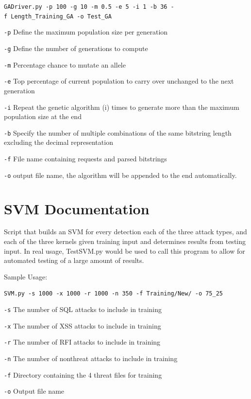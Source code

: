 \begin{appendices}
\texttt{GADriver.py\ -p\ 100\ -g\ 10\ -m\ 0.5\ -e\ 5\ -i\ 1\ -b\ 36\ -f\ Length\_Training\_GA\ -o\ Test\_GA}

\texttt{-p} Define the maximum population size per generation

\texttt{-g} Define the number of generations to compute

\texttt{-m} Percentage chance to mutate an allele

\texttt{-e} Top percentage of current population to carry over unchanged
to the next generation

\texttt{-i} Repeat the genetic algorithm (i) times to generate more than
the maximum population size at the end

\texttt{-b} Specify the number of multiple combinations of the same
bitstring length excluding the decimal representation

\texttt{-f} File name containing requests and parsed bitstrings

\texttt{-o} output file name, the algorithm will be appended to the end
automatically.

\section{SVM Documentation} \label{app:svmDocumentation}

Script that builds an SVM for every detection each of the three attack
types, and each of the three kernels given training input and determines
results from testing input. In real usage, TestSVM.py would be used to
call this program to allow for automated testing of a large amount of
results.

Sample Usage:

\texttt{SVM.py\ -s\ 1000\ -x\ 1000\ -r\ 1000\ -n\ 350\ -f\ Training/New/\ -o\ 75\_25}

\texttt{-s} The number of SQL attacks to include in training

\texttt{-x} The number of XSS attacks to include in training

\texttt{-r} The number of RFI attacks to include in training

\texttt{-n} The number of nonthreat attacks to include in training

\texttt{-f} Directory containing the 4 threat files for training

\texttt{-o} Output file name


\end{appendices}
